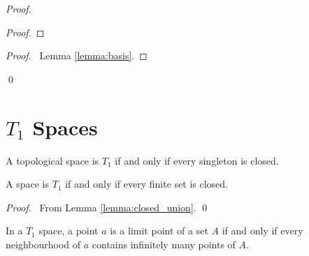 \begin{proof}
    \pf
    \begin{proof}
    \end{proof}
    \qedstep
    \begin{proof}
        \pf\ Lemma \ref{lemma:basis}.
    \end{proof}
    \qed
\end{proof}

\section{$T_1$ Spaces}

\begin{definition}[$T_1$ Space]
    A topological space is $T_1$ if and only if every singleton is closed.
\end{definition}

\begin{lemma}
    A space is $T_1$ if and only if every finite set is closed.
\end{lemma}

\begin{proof}
    \pf\ From Lemma \ref{lemma:closed_union}. \qed
\end{proof}

\begin{theorem}
    \label{theorem:limit_point_T1}
    In a $T_1$ space, a point $a$ is a limit point of a set $A$ if and only if every neighbourhood of $a$
    contains infinitely many points of $A$.
\end{theorem}

